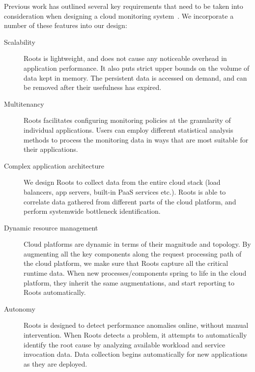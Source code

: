 Previous work has outlined several key requirements that need to be taken into consideration when
designing a cloud monitoring system~\cite{DaCunhaRodrigues:2016:MCC:2851613.2851619,Ibidunmoye:2015:PAD:2808687.2791120}. 
We incorporate a number of these features into our design:
\begin{description}
\item[Scalability] Roots is lightweight, and does not cause any noticeable overhead in 
application performance. It also puts strict upper bounds on the volume of data kept in memory. 
The persistent data is accessed on demand, and can be removed after their usefulness has expired.
\item[Multitenancy] Roots facilitates configuring monitoring policies at the granularity of individual applications.
Users can employ different statistical analysis methods to process the monitoring data in ways that are 
most suitable for their applications.
\item[Complex application architecture] We design Roots to collect data from the entire cloud stack 
(load balancers, app servers, built-in PaaS services etc.). Roots is able to correlate data gathered
from different parts of the cloud platform, and perform systemwide bottleneck identification.
\item[Dynamic resource management] Cloud platforms are dynamic in terms of their magnitude 
and topology. By augmenting all the key components along the request processing path of the cloud platform,
we make sure that Roots capture all the critical runtime data. When new processes/components
spring to life in the cloud platform, they inherit the same augmentations, and start reporting to Roots automatically.
\item[Autonomy] Roots is designed to detect performance anomalies online, without manual intervention.
When Roots detects a problem, it attempts to automatically identify the root cause by analyzing
available workload and service invocation data. Data collection begins automatically for new
applications as they are deployed.
\end{description}

